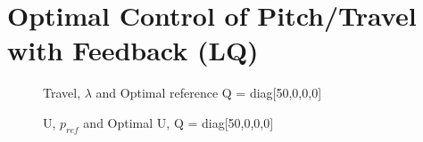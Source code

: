 \documentclass[11pt, a4paper, USenglish]{article} %
\begin{document}
\section{Optimal Control of Pitch/Travel with Feedback (LQ)} %
\label{sec:optimal_control_of_pitch_travel_with_feedback_lq_}
\begin{figure}[H] 
        \centering
        \setlength{\figureheight}{6cm}
        \setlength{\figurewidth}{10cm}
        
        \caption{Travel, \(\lambda\) and Optimal reference Q = diag[50,0,0,0]} 
\label{fig:ex3_travel} 
\end{figure}    

\begin{figure}[H] 
        \centering
        \setlength{\figureheight}{6cm}
        \setlength{\figurewidth}{10cm}
        
        \caption{U, \(p_{ref}\) and Optimal U, Q = diag[50,0,0,0]} 
\label{fig:ex3_u} 
\end{figure} 
\end{document}
